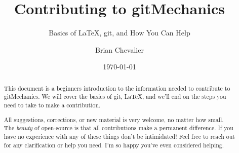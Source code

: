 \documentclass[landscape, twocolumn, 12pt]{article}
\title{Contributing to gitMechanics}
\subtitle{Basics of \LaTeX{}, git, and How You Can Help}
\author{Brian Chevalier}
\date{\today}
\begin{document}
\maketitle

\renewcommand{\abstractname}{Welcome to the gitMechanics Team!}

\begin{abstract}
This document is a beginners introduction to the information needed to contribute to gitMechanics. We will cover the basics of git, \LaTeX{}, and we'll end on the steps you need to take to make a contribution.

All suggestions, corrections, or new material is very welcome, no matter how small. The \textit{beauty} of open-source is that all contributions make a permanent difference. If you have no experience with any of these things don't be intimidated! Feel free to reach out for any clarification or help you need. I'm so happy you've even considered helping.
\end{abstract}






\begin{appendices}
	
	
	\clearpage
	
\end{appendices}





%
%
\end{document}
